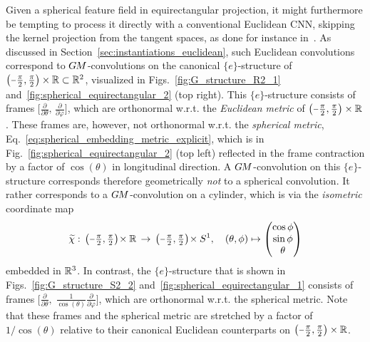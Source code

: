 Given a spherical feature field in equirectangular projection, it might
furthermore
be tempting to process it directly with a conventional Euclidean CNN, skipping the kernel projection from the tangent spaces, as done for instance in~\cite{lai2017semantic,hu2017spherical}.
As discussed in Section~\ref{sec:instantiations_euclidean}, such Euclidean convolutions correspond to $G\mkern-1.4muM$-convolutions on the canonical $\{e\}$-structure of $\big(\minus\frac{\pi}{2}, \frac{\pi}{2}\big) \times \R \subset \R^2$, visualized in Figs.~\ref{fig:G_structure_R2_1} and~\ref{fig:spherical_equirectangular_2} (top right).
This $\{e\}$-structure consists of frames 
$\big[ \frac{\partial}{\partial\theta} ,\, \frac{\partial}{\partial\varphi} \big]$,
which are orthonormal w.r.t. the \emph{Euclidean metric} of $\big(\minus\frac{\pi}{2}, \frac{\pi}{2}\big) \times \R$.
These frames are, however, not orthonormal w.r.t. the \emph{spherical metric}, Eq.~\eqref{eq:spherical_embedding_metric_explicit}, which is in Fig.~\ref{fig:spherical_equirectangular_2} (top left) reflected in the frame contraction by a factor of $\cos(\theta)$ in longitudinal direction.
A $G\mkern-1.4muM$-convolution on this $\{e\}$-structure corresponds therefore geometrically \emph{not} to a spherical convolution.
It rather corresponds to a $G\mkern-1.4muM$-convolution on a cylinder, which is via the \emph{isometric} coordinate map
\begin{align}\label{eq:cylindrical_coords}
    \widetilde{\chi}:\, \big( {\textstyle \minus\frac{\pi}{2}, \frac{\pi}{2}} \big) \!\times \R
    \,\to\, \big( {\textstyle \minus\frac{\pi}{2}, \frac{\pi}{2}} \big) \!\times S^1,
    \quad (\theta,\phi) \mapsto
    \begin{pmatrix}
        \cos{\phi} \\
        \sin{\phi} \\
        \theta
    \end{pmatrix}
\end{align}
embedded in $\mathbb{R}^3$.
In contrast, the $\{e\}$-structure that is shown in Figs.~\ref{fig:G_structure_S2_2} and~\ref{fig:spherical_equirectangular_1} consists of frames
$\big[ \frac{\partial}{\partial\theta} ,\; \frac{1}{\cos(\theta)} \frac{\partial}{\partial\varphi} \big]$,
which are orthonormal w.r.t. the spherical metric.
Note that these frames and the spherical metric are stretched by a factor of $1/\cos(\theta)$ relative to their canonical Euclidean counterparts on $\big( {\textstyle \minus\frac{\pi}{2}, \frac{\pi}{2}} \big) \times \R$.


